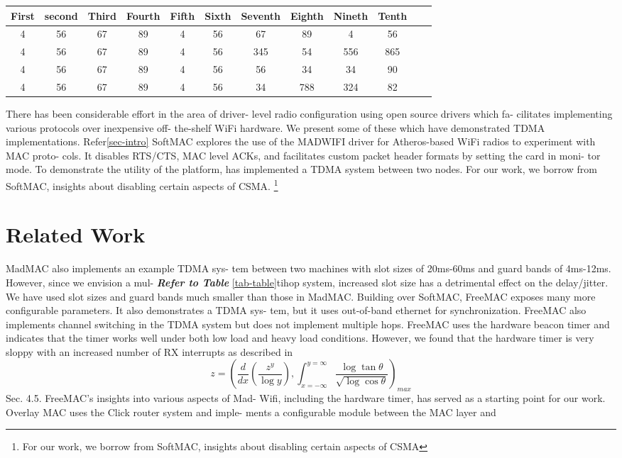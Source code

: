\documentclass[a4paper,11pt,twocolumn,dvips]{report}
\begin{document}
\begin{table*}
\label{tab-table}
\centering
\begin{tabular}{|c|c|c|c|c|c|c|c|c|c|c|c|}
\hline
First & second & Third & Fourth& Fifth & Sixth & Seventh & Eighth&Nineth&Tenth\\
\hline
4 & 56 & 67 &89&4 & 56 & 67 &89&4 & 56 \\
\hline
4 & 56 & 67 &89&4 & 56 &345& 54& 556& 865\\
\hline
4 & 56 & 67 &89&4 & 56 &56& 34& 34&90\\
\hline
4 & 56 & 67 &89&4 & 56 &34& 788& 324&82\\
\hline

\end{tabular}
\end{table*}

There has been considerable effort in the area of driver-
level radio configuration using open source drivers which fa-
cilitates implementing various protocols over inexpensive off-
the-shelf WiFi hardware. We present some of these which
have demonstrated TDMA implementations.
{\huge Refer}\ref{sec-intro}
SoftMAC  explores the use of the MADWIFI driver for
Atheros-based WiFi radios to experiment with MAC proto-
cols. It disables RTS/CTS, MAC level ACKs, and facilitates\cite{article1}
custom packet header formats by setting the card in moni-
tor mode. To demonstrate the utility of the platform,  has
implemented a TDMA system between two nodes. For our
work, we borrow\cite{sample5} from SoftMAC, insights about disabling
certain aspects of CSMA.
\footnote{ For our
work, we borrow from SoftMAC, insights about disabling
certain aspects of CSMA}
\section{Related Work}
MadMAC  also implements an example TDMA sys-
tem between two machines with slot sizes of 20ms-60ms and
guard bands of 4ms-12ms. However, since we envision a mul-
{\bf\it \large  Refer to Table }\ref{tab-table}tihop system, increased slot size has a detrimental effect on
the delay/jitter. We have used slot sizes and guard bands
much smaller than those in MadMAC.
Building over SoftMAC, FreeMAC  exposes many more
configurable parameters. It also demonstrates a TDMA sys-
tem, but it uses out-of-band ethernet for synchronization.
FreeMAC also implements channel switching in the TDMA
system but does not implement multiple hops. FreeMAC
uses the hardware beacon timer and indicates that the timer
works well under both low load and heavy load conditions.\cite{google}
However, we found that the hardware timer is very sloppy
with an increased number of RX interrupts as described in
\begin{equation}
z=\left(\frac{d}{dx}\left(\frac{z^y}{\log y}\right),\int_{x=-\infty}^{y=\infty}\frac{\log \tan \theta}{\sqrt{\log \cos \theta}}\right)_{max}
\end{equation}
Sec. 4.5. FreeMAC’s insights into various aspects of Mad-
Wifi, including the hardware timer, has served as a starting
point for our work.
Overlay MAC uses the Click router system and imple-
ments a configurable module between the MAC layer and
\end{document}
